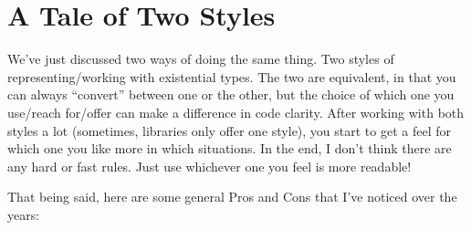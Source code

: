 \documentclass[]{article}
\begin{document}
\hypertarget{a-tale-of-two-styles}{%
\section{A Tale of Two Styles}\label{a-tale-of-two-styles}}

We've just discussed two ways of doing the same thing. Two styles of
representing/working with existential types. The two are equivalent, in that you
can always ``convert'' between one or the other, but the choice of which one you
use/reach for/offer can make a difference in code clarity. After working with
both styles a lot (sometimes, libraries only offer one style), you start to get
a feel for which one you like more in which situations. In the end, I don't
think there are any hard or fast rules. Just use whichever one you feel is more
readable!

That being said, here are some general Pros and Cons that I've noticed over the
years:
\end{document}
